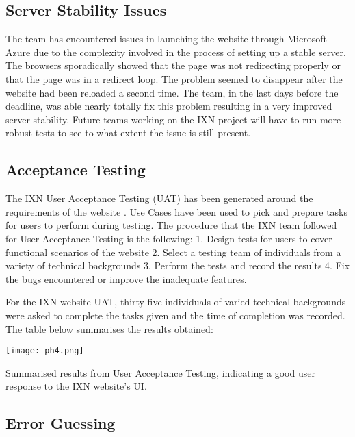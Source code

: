 \documentclass[fontsize=11pt]{extarticle}
\numberwithin{figure}{section} %
\begin{document}
\hypertarget{server-stability-issues}{%
\subsection{Server Stability Issues}\label{server-stability-issues}}

The team has encountered issues in launching the website through
Microsoft Azure due to the complexity involved in the process of setting
up a stable server. The browsers sporadically showed that the page was
not redirecting properly or that the page was in a redirect loop. The
problem seemed to disappear after the website had been reloaded a second
time. The team, in the last days before the deadline, was able nearly
totally fix this problem resulting in a very improved server stability.
Future teams working on the IXN project will have to run more robust
tests to see to what extent the issue is still present.

\hypertarget{acceptance-testing}{%
\subsection{Acceptance Testing}\label{acceptance-testing}}

The IXN User Acceptance Testing (UAT) has been generated around the
requirements of the website \cite{g7} . Use Cases have been used to pick
and prepare tasks for users to perform during testing. The procedure
that the IXN team followed for User Acceptance Testing is the following:
1. Design tests for users to cover functional scenarios of the website
2. Select a testing team of individuals from a variety of technical
backgrounds 3. Perform the tests and record the results 4. Fix the bugs
encountered or improve the inadequate features.

For the IXN website UAT, thirty-five individuals of varied technical
backgrounds were asked to complete the tasks given and the time of
completion was recorded. The table below summarises the results
obtained:

\begin{table}[H]
      \centering
      \texttt{[image: ph4.png]}
      \caption{Summarised results from User Acceptance Testing, indicating a good user response to the IXN website's UI. }
 \end{table}

\hypertarget{error-guessing}{%
\subsection{Error Guessing}\label{error-guessing}}
\end{document}
